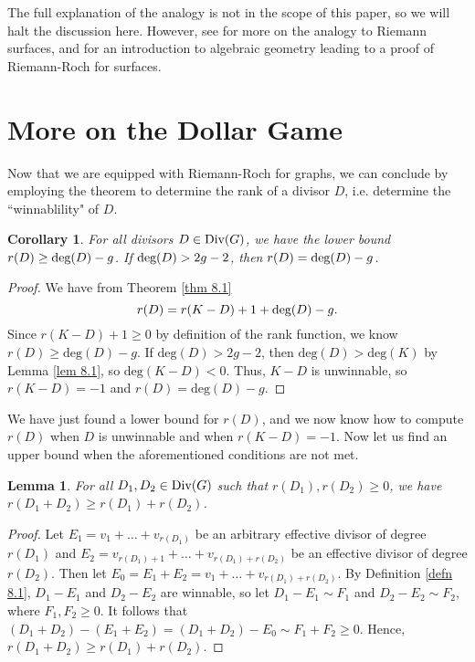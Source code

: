 \documentclass[openany, amssymb, psamsfonts]{amsart}
\newtheorem{cor}{Corollary}[section]
\newtheorem{lem}{Lemma}[section]
\theoremstyle{definition}
\numberwithin{equation}{section}
\begin{document}
The full explanation of the analogy is not in the scope of this paper, so we will halt the discussion here. However, see \cite{baker} for more on the analogy to Riemann surfaces, and \cite{riemann-roch} for an introduction to algebraic geometry leading to a proof of Riemann-Roch for surfaces.





\section{More on the Dollar Game}
\label{9}

Now that we are equipped with Riemann-Roch for graphs, we can conclude by employing the theorem to determine the rank of a divisor $D$, i.e. determine the ``winnablility" of $D$.

\begin{cor}
\label{cor 9.1}
For all divisors $D\in \textup{Div}(G)$, we have the lower bound $r(D)\geq \textup{deg}(D)-g$. If $\textup{deg}(D)>2g-2$, then $r(D)=\textup{deg}(D)-g$.
\end{cor}
\begin{proof}
We have from Theorem \ref{thm 8.1} 
\[r(D)=r(K-D)+1+\textup{deg}(D)-g.\]
Since $r(K-D)+1\geq 0$ by definition of the rank function, we know $r(D)\geq \text{deg}(D)-g$. If $\text{deg}(D)>2g-2$, then $\text{deg}(D)>\text{deg}(K)$ by Lemma \ref{lem 8.1}, so $\text{deg}(K-D)<0$. Thus, $K-D$ is unwinnable, so $r(K-D)=-1$ and $r(D)=\text{deg}(D)-g$.
\end{proof}

We have just found a lower bound for $r(D)$, and we now know how to compute $r(D)$ when $D$ is unwinnable and when $r(K-D)=-1$. Now let us find an upper bound when the aforementioned conditions are not met. 

\begin{lem}
\label{lem 9.1}
For all $D_1,D_2 \in \textup{Div}(G)$ such that $r(D_1),r(D_2)\geq 0$, we have $r(D_1 + D_2) \geq r(D_1) + r(D_2)$.
\end{lem}
\begin{proof}
Let $E_1=v_1+\dots+v_{r(D_1)}$ be an arbitrary effective divisor of degree $r(D_1)$ and $E_2=v_{r(D_1)+1}+\dots+v_{r(D_1)+r(D_2)}$ be an effective divisor of degree $r(D_2)$. Then let $E_0=E_1+E_2=v_1+\dots+v_{r(D_1)+r(D_2)}$. By Definition \ref{defn 8.1}, $D_1-E_1$ and $D_2-E_2$ are winnable, so let $D_1-E_1\sim F_1$ and $D_2-E_2\sim F_2$, where $F_1, F_2\geq 0$. It follows that $(D_1+D_2)-(E_1+E_2)=(D_1+D_2)-E_0\sim F_1+F_2\geq 0$. Hence, $r(D_1 + D_2) \geq r(D_1) + r(D_2)$.
\end{proof}
\end{document}
